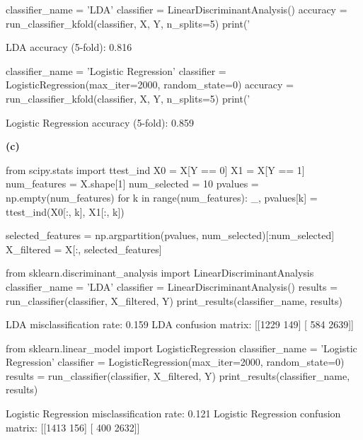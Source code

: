 \begin{python}
classifier_name = 'LDA'
classifier = LinearDiscriminantAnalysis()
accuracy = run_classifier_{k}fold(classifier, X, Y, n_splits=5)
print('%
\end{python}
\begin{console}
LDA accuracy (5-fold): 0.816
\end{console}

\begin{python}
classifier_name = 'Logistic Regression'
classifier = LogisticRegression(max_{i}ter=2000, random_state=0)
accuracy = run_classifier_{k}fold(classifier, X, Y, n_splits=5)
print('%
\end{python}
\begin{console}
Logistic Regression accuracy (5-fold): 0.859
\end{console}
\textbf{(c)}

\begin{python}
from scipy.stats import ttest_{i}nd
X0 = X[Y == 0]
X1 = X[Y == 1]
num_features = X.shape[1]
num_selected = 10
pvalues = np.empty(num_features)
for k in range(num_features):
    _, pvalues[k] = ttest_{i}nd(X0[:, k], X1[:, k])
    
selected_features = np.argpartition(pvalues, num_selected)[:num_selected]
X_filtered = X[:, selected_features]
\end{python}

\begin{python}
from sklearn.discriminant_analysis import LinearDiscriminantAnalysis
classifier_name = 'LDA'
classifier = LinearDiscriminantAnalysis()
results = run_classifier(classifier, X_filtered, Y)
print_results(classifier_name, results)
\end{python}
\begin{console}
LDA misclassification rate: 0.159
LDA confusion matrix:
[[1229  149]
 [ 584 2639]]
\end{console}

\begin{python}
from sklearn.linear_model import LogisticRegression
classifier_name = 'Logistic Regression'
classifier = LogisticRegression(max_{i}ter=2000, random_state=0)
results = run_classifier(classifier, X_filtered, Y)
print_results(classifier_name, results)
\end{python}
\begin{console}
Logistic Regression misclassification rate: 0.121
Logistic Regression confusion matrix:
[[1413  156]
 [ 400 2632]]
\end{console}

